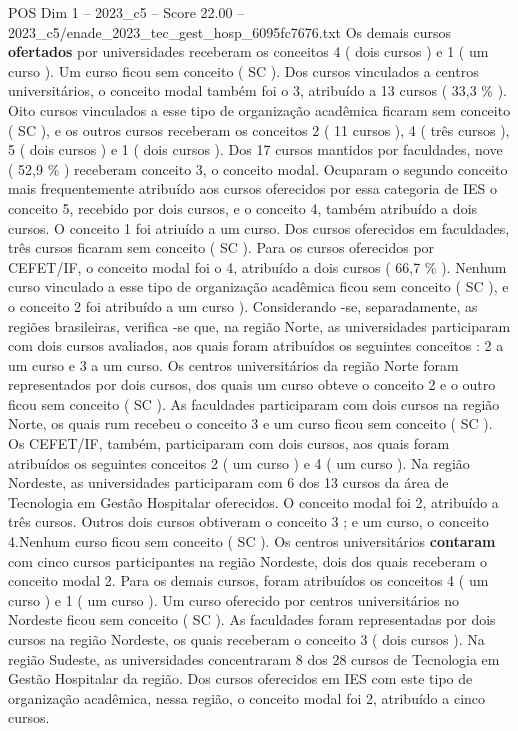 \begin{textsample}{POS Dim 1 – 2023\_c5 – Score 22.00 – 2023\_c5/enade\_2023\_tec\_gest\_hosp\_6095fc7676.txt}
Os demais cursos \textbf{ofertados} por universidades receberam os conceitos 4 ( dois cursos ) e 1 ( um curso ).
Um curso ficou sem conceito ( SC ).
Dos cursos vinculados a centros universitários, o conceito modal também foi o 3, atribuído a 13 cursos ( 33,3 \% ).
Oito cursos vinculados a esse tipo de organização acadêmica ficaram sem conceito ( SC ), e os outros cursos receberam os conceitos 2 ( 11 cursos ), 4 ( três cursos ), 5 ( dois cursos ) e 1 ( dois cursos ).
Dos 17 cursos mantidos por faculdades, nove ( 52,9 \% ) receberam conceito 3, o conceito modal.
Ocuparam o segundo conceito mais frequentemente atribuído aos cursos oferecidos por essa categoria de IES o conceito 5, recebido por dois cursos, e o conceito 4, também atribuído a dois cursos.
O conceito 1 foi atriuído a um curso.
Dos cursos oferecidos em faculdades, três cursos ficaram sem conceito ( SC ).
Para os cursos oferecidos por CEFET/IF, o conceito modal foi o 4, atribuído a dois cursos ( 66,7 \% ).
Nenhum curso vinculado a esse tipo de organização acadêmica ficou sem conceito ( SC ), e o conceito 2 foi atribuído a um curso ).
Considerando -se, separadamente, as regiões brasileiras, verifica -se que, na região Norte, as universidades participaram com dois cursos avaliados, aos quais foram atribuídos os seguintes conceitos : 2 a um curso e 3 a um curso.
Os centros universitários da região Norte foram representados por dois cursos, dos quais um curso obteve o conceito 2 e o outro ficou sem conceito ( SC ).
As faculdades participaram com dois cursos na região Norte, os quais rum recebeu o conceito 3 e um curso ficou sem conceito ( SC ).
Os CEFET/IF, também, participaram com dois cursos, aos quais foram atribuídos os seguintes conceitos 2 ( um curso ) e 4 ( um curso ).
Na região Nordeste, as universidades participaram com 6 dos 13 cursos da área de Tecnologia em Gestão Hospitalar oferecidos.
O conceito modal foi 2, atribuído a três cursos.
Outros dois cursos obtiveram o conceito 3 ; e um curso, o conceito 4.Nenhum curso ficou sem conceito ( SC ).
Os centros universitários \textbf{contaram} com cinco cursos participantes na região Nordeste, dois dos quais receberam o conceito modal 2.
Para os demais cursos, foram atribuídos os conceitos 4 ( um curso ) e 1 ( um curso ).
Um curso oferecido por centros universitários no Nordeste ficou sem conceito ( SC ).
As faculdades foram representadas por dois cursos na região Nordeste, os quais receberam o conceito 3 ( dois cursos ).
Na região Sudeste, as universidades concentraram 8 dos 28 cursos de Tecnologia em Gestão Hospitalar da região.
Dos cursos oferecidos em IES com este tipo de organização acadêmica, nessa região, o conceito modal foi 2, atribuído a cinco cursos.

\end{textsample}
